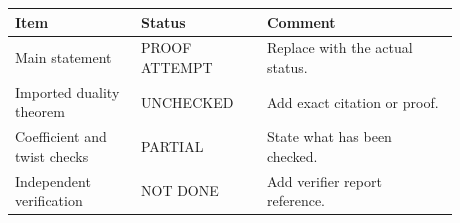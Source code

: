 \begin{center}
\begin{tabular}{p{0.25\linewidth}p{0.25\linewidth}p{0.38\linewidth}}
\textbf{Item} & \textbf{Status} & \textbf{Comment} \\
\hline
Main statement & PROOF ATTEMPT & Replace with the actual status. \\
Imported duality theorem & UNCHECKED & Add exact citation or proof. \\
Coefficient and twist checks & PARTIAL & State what has been checked. \\
Independent verification & NOT DONE & Add verifier report reference. \\
\end{tabular}
\end{center}
